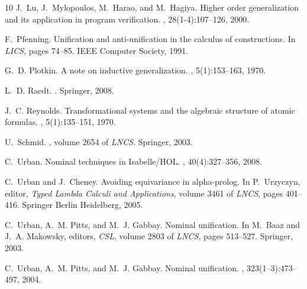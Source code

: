 \documentclass[11pt,a4paper]{amsart}
\theoremstyle{definition}
\begin{document}
\begin{thebibliography}{10}
J.~Lu, J.~Mylopoulos, M.~Harao, and M.~Hagiya.
\newblock Higher order generalization and its application in program
  verification.
, 28(1-4):107--126, 2000.

F.~Pfenning.
\newblock Unification and anti-unification in the calculus of constructions.
\newblock In {\em LICS}, pages 74--85. IEEE Computer Society, 1991.

G.~D. Plotkin.
\newblock A note on inductive generalization.
, 5(1):153--163, 1970.

L.~D. Raedt.
.
\newblock Springer, 2008.

J.~C. Reynolds.
\newblock Transformational systems and the algebraic structure of atomic
  formulas.
, 5(1):135--151, 1970.

U.~Schmid.
,
  volume 2654 of {\em LNCS}.
\newblock Springer, 2003.

C.~Urban.
\newblock Nominal techniques in {Isabelle/HOL}.
, 40(4):327--356, 2008.

C.~Urban and J.~Cheney.
\newblock Avoiding equivariance in alpha-prolog.
\newblock In P.~Urzyczyn, editor, {\em Typed Lambda Calculi and Applications},
  volume 3461 of {\em LNCS}, pages 401--416. Springer Berlin Heidelberg, 2005.

C.~Urban, A.~M. Pitts, and M.~J. Gabbay.
\newblock Nominal unification.
\newblock In M.~Baaz and J.~A. Makowsky, editors, {\em CSL}, volume 2803 of
  {\em LNCS}, pages 513--527. Springer, 2003.

C.~Urban, A.~M. Pitts, and M.~J. Gabbay.
\newblock Nominal unification.
, 323(1--3):473--497, 2004.

\end{thebibliography}
\end{document}
